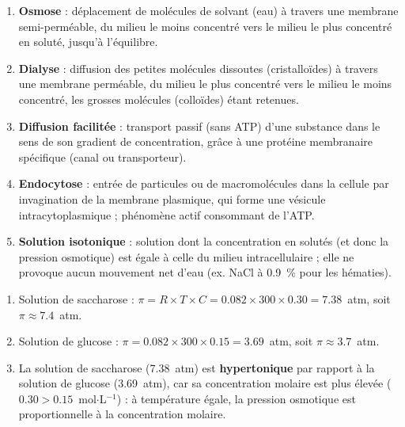 \documentclass[11pt]{article}
\begin{document}
\begin{corrige}
\begin{enumerate}
\item \textbf{Osmose} : déplacement de molécules de solvant (eau) à travers une membrane semi-perméable, du milieu le moins concentré vers le milieu le plus concentré en soluté, jusqu'à l'équilibre.
\item \textbf{Dialyse} : diffusion des petites molécules dissoutes (cristalloïdes) à travers une membrane perméable, du milieu le plus concentré vers le milieu le moins concentré, les grosses molécules (colloïdes) étant retenues.
\item \textbf{Diffusion facilitée} : transport passif (sans ATP) d'une substance dans le sens de son gradient de concentration, grâce à une protéine membranaire spécifique (canal ou transporteur).
\item \textbf{Endocytose} : entrée de particules ou de macromolécules dans la cellule par invagination de la membrane plasmique, qui forme une vésicule intracytoplasmique ; phénomène actif consommant de l'ATP.
\item \textbf{Solution isotonique} : solution dont la concentration en solutés (et donc la pression osmotique) est égale à celle du milieu intracellulaire ; elle ne provoque aucun mouvement net d'eau (ex. NaCl à \num{0,9}~\% pour les hématies).
\end{enumerate}
\end{corrige}

\begin{corrige}
\begin{enumerate}
\item Solution de saccharose : $\pi = R \times T \times C = \num{0,082} \times 300 \times \num{0,30} = \num{7,38}$~atm, soit $\pi \approx \num{7,4}$~atm.
\item Solution de glucose : $\pi = \num{0,082} \times 300 \times \num{0,15} = \num{3,69}$~atm, soit $\pi \approx \num{3,7}$~atm.
\item La solution de saccharose (\num{7,38}~atm) est \textbf{hypertonique} par rapport à la solution de glucose (\num{3,69}~atm), car sa concentration molaire est plus élevée ($\num{0,30} > \num{0,15}$~mol$\cdot$L$^{-1}$) : à température égale, la pression osmotique est proportionnelle à la concentration molaire.
\end{enumerate}
\end{corrige}
\end{document}
